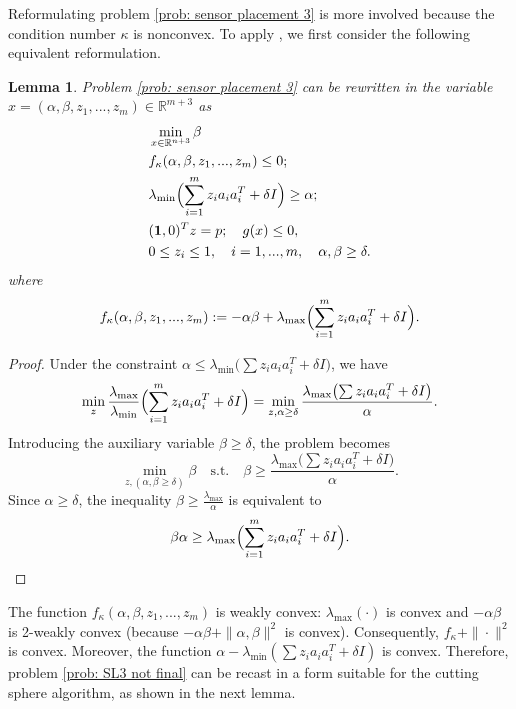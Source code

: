 \documentclass[12pt]{amsart}
\theoremstyle{plain}
\newtheorem{lemma}[theorem]{Lemma}
\theoremstyle{definition}
\begin{document}
Reformulating problem \eqref{prob: sensor placement 3} is more involved because the condition number $\kappa$ is nonconvex. To apply \cite[Theorem 1]{bednarczuk2026outer}, we first consider the following equivalent reformulation.

\begin{lemma}
 Problem \eqref{prob: sensor placement 3} can be rewritten in the variable $x = (\alpha, \beta, z_1,...,z_m) \in \mathbb{R}^{m+3}$ as
\begin{equation}
\label{prob: SL3 not final}
\begin{split}
& \min_{x \in \mathbb{R}^{n+3}} \beta \\
& f_\kappa(\alpha, \beta, z_1,...,z_m)\le 0; \\
& \lambda_{\min}\Bigl( \sum_{i=1}^m z_i a_i a_i^T + \delta I \Bigr) \ge \alpha; \\
& (\mathbf{1},0)^T z = p;\quad g(x)\le 0, \\
& 0\le z_i \le 1,\quad i=1,...,m, \quad \alpha,\beta \ge \delta.
\end{split}
\end{equation}
where
\begin{equation}
\label{prob: functionss}
f_\kappa(\alpha, \beta, z_1,...,z_m) := -\alpha\beta + \lambda_{\max}\Bigl( \sum_{i=1}^m z_i a_i a_i^T + \delta I \Bigr).
\end{equation}
\end{lemma}

\begin{proof}
Under the constraint $\alpha \le \lambda_{\min}\bigl(\sum z_i a_i a_i^T + \delta I\bigr)$, we have
\[
\min_z \frac{\lambda_{\max}}{\lambda_{\min}}\Bigl( \sum_{i=1}^m z_i a_i a_i^T + \delta I \Bigr) = \min_{z,\alpha\ge\delta} \frac{\lambda_{\max}\bigl(\sum z_i a_i a_i^T + \delta I\bigr)}{\alpha}.
\]
Introducing the auxiliary variable $\beta \ge \delta$, the problem becomes
\begin{equation}
\label{eq: beta}
\min_{z,(\alpha,\beta\ge\delta)} \beta \quad\text{s.t.}\quad \beta \ge \frac{\lambda_{\max}\bigl(\sum z_i a_i a_i^T + \delta I\bigr)}{\alpha}.
\end{equation}
Since $\alpha \ge \delta$, the inequality $\beta \ge \frac{\lambda_{\max}}{\alpha}$ is equivalent to
\[
\beta\alpha \ge \lambda_{\max}\Bigl( \sum_{i=1}^m z_i a_i a_i^T + \delta I \Bigr).
\]
\end{proof}

The function $f_\kappa(\alpha, \beta, z_1,...,z_m)$ is weakly convex: $\lambda_{\max}(\cdot)$ is convex and $-\alpha\beta$ is 2-weakly convex (because $-\alpha\beta + \|\alpha,\beta\|^2$ is convex). Consequently, $f_\kappa + \|\cdot\|^2$ is convex. Moreover, the function $\alpha - \lambda_{\min}(\sum z_i a_i a_i^T + \delta I)$ is convex. Therefore, problem \eqref{prob: SL3 not final} can be recast in a form suitable for the cutting sphere algorithm, as shown in the next lemma.
\end{document}

